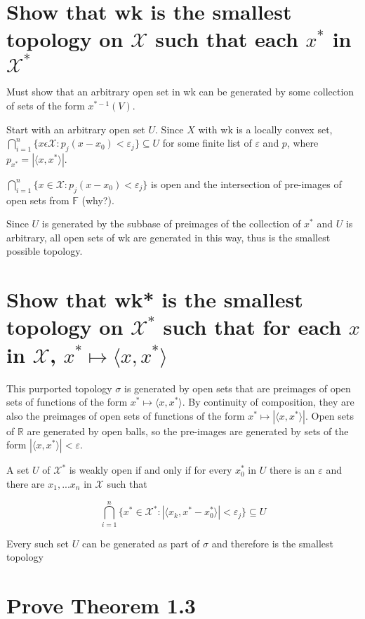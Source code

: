 \documentclass{article}
\begin{document}
\section{Show that wk is the smallest topology on $\mathscr{X}$ such that each $x^*$ in $\mathscr{X}^*$}

Must show that an arbitrary open set in wk can be generated by some collection of sets of the form $x^{*-1}(V)$.

Start with an arbitrary open set $U$. Since $X$ with wk is a locally convex set, $\bigcap^n_{i=1}\{x\epsilon \mathscr{X} : p_j( x-x_0) < \varepsilon_j\} \subseteq U$ for some finite list of $\varepsilon$ and $p$, where $p_{x^*}=|\langle x,x^*\rangle|$.

 $\bigcap^n_{i=1}\{x\in \mathscr{X} : p_j( x-x_0) < \varepsilon_j\}$ is open and the intersection of pre-images of open sets from $\mathbb{F}$ (why?).

Since $U$ is generated by the subbase of preimages of the collection of $x^*$ and $U$ is arbitrary, all open sets of wk are generated in this way, thus is the smallest possible topology.

\section{Show that wk* is the smallest topology on $\mathscr{X}^*$ such that for each $x$ in $\mathscr{X}$, $x^* \mapsto \langle x, x^* \rangle$}


This purported topology $\sigma$ is generated by open sets that are preimages of open sets of functions of the form $x^* \mapsto \langle x, x^* \rangle$. By continuity of composition, they are also the preimages of open sets of functions of the form $x^* \mapsto | \langle x, x^* \rangle | $. Open sets of $\mathbb{R}$ are generated by open balls, so the pre-images are generated by sets of the form $| \langle x, x^* \rangle | < \varepsilon $.

A set $U$ of $\mathscr{X}^*$ is weakly open if and only if for every $x^*_0$ in $U$ there is an $\varepsilon$ and there are $x_1, ... x_n$ in $\mathscr{X}$ such that 

$$\bigcap^n_{i=1}\{x^*\in \mathscr{X}^* : |\langle x_k, x^* - x^*_0 \rangle| < \varepsilon_j\} \subseteq U$$

Every such set $U$ can be generated as part of $\sigma$ and therefore is the smallest topology 

\section{Prove Theorem 1.3}
\end{document}
